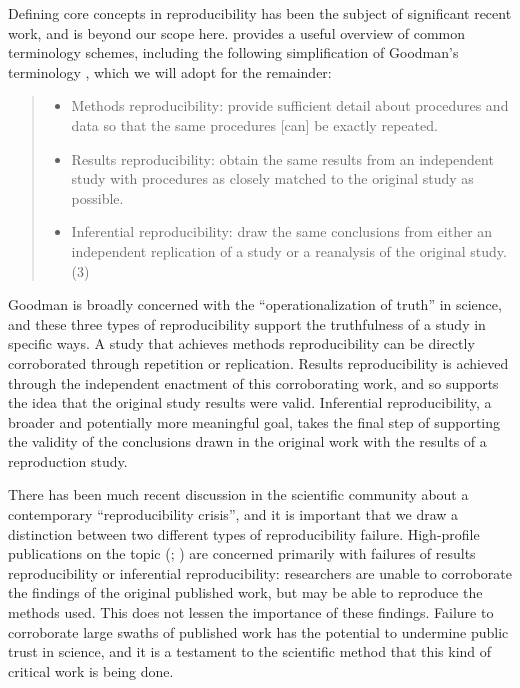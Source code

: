 Defining core concepts in reproducibility has been the subject of
significant recent work, and is beyond our scope here. \textcite{plesser_reproducibility_2018}
provides a useful overview of common terminology schemes, including the
following simplification of Goodman’s terminology \parencite{goodman_what_2016},
which we will adopt for the remainder:
\begin{quote}
    \begin{itemize}
        \item Methods reproducibility: provide sufficient detail about
            procedures and data so that the same procedures [can] be exactly
            repeated.
        \item Results reproducibility: obtain the same results from an
            independent study with procedures as closely matched to the original
            study as possible.
        \item Inferential reproducibility: draw the same conclusions from either
            an independent replication of a study or a reanalysis of the original
            study. (3)
    \end{itemize}
\end{quote}
Goodman is broadly concerned with the “operationalization of truth” in science,
and these three types of reproducibility support the truthfulness of a study in
specific ways. A study that achieves methods reproducibility can be directly
corroborated through repetition or replication. Results reproducibility is
achieved through the independent enactment of this corroborating work, and so
supports the idea that the original study results were valid. Inferential
reproducibility, a broader and potentially more meaningful goal, takes the final
step of supporting the validity of the conclusions drawn in the original work
with the results of a reproduction study.

There has been much recent discussion in the scientific community about a
contemporary “reproducibility crisis”, and it is important that we draw a
distinction between two different types of reproducibility failure. High-profile
publications on the topic (\cite{open_science_collaboration_estimating_2015}; \cite{baker_1500_2016})
are concerned primarily with failures of results reproducibility or inferential
reproducibility: researchers are unable to corroborate the findings of the
original published work, but may be able to reproduce the methods used. This
does not lessen the importance of these findings. Failure to corroborate large
swaths of published work has the potential to undermine public trust in science,
and it is a testament to the scientific method that this kind of critical work
is being done.

